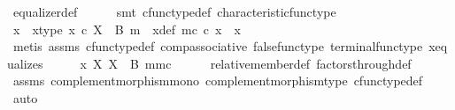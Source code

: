 \begin{isabellebody}
\ equalizer{\isacharunderscore}{\kern0pt}def\isanewline
\ \ \ \ \isamarkupfalse%
\ {\isacharparenleft}{\kern0pt}smt\ cfunc{\isacharunderscore}{\kern0pt}type{\isacharunderscore}{\kern0pt}def\ characteristic{\isacharunderscore}{\kern0pt}func{\isacharunderscore}{\kern0pt}type{\isacharparenright}{\kern0pt}\ \isanewline
\ \ \isamarkupfalse%
\ \isamarkupfalse%
\ x{\isacharprime}{\kern0pt}\ \ x{\isacharprime}{\kern0pt}{\isacharunderscore}{\kern0pt}type{\isacharcolon}{\kern0pt}\ {\isachardoublequoteopen}x{\isacharprime}{\kern0pt}\ {\isasymin}\isactrlsub c\ X\ {\isasymsetminus}\ {\isacharparenleft}{\kern0pt}B{\isacharcomma}{\kern0pt}\ m{\isacharparenright}{\kern0pt}{\isachardoublequoteclose}\ \ x{\isacharprime}{\kern0pt}{\isacharunderscore}{\kern0pt}def{\isacharcolon}{\kern0pt}\ {\isachardoublequoteopen}m\isactrlsup c\ {\isasymcirc}\isactrlsub c\ x{\isacharprime}{\kern0pt}\ {\isacharequal}{\kern0pt}\ x{\isachardoublequoteclose}\isanewline
\ \ \ \ \isamarkupfalse%
\ {\isacharparenleft}{\kern0pt}metis\ assms{\isacharparenleft}{\kern0pt}{}{\isacharparenright}{\kern0pt}\ cfunc{\isacharunderscore}{\kern0pt}type{\isacharunderscore}{\kern0pt}def\ comp{\isacharunderscore}{\kern0pt}associative\ false{\isacharunderscore}{\kern0pt}func{\isacharunderscore}{\kern0pt}type\ terminal{\isacharunderscore}{\kern0pt}func{\isacharunderscore}{\kern0pt}type\ x{\isacharunderscore}{\kern0pt}equalizes{\isacharparenright}{\kern0pt}\isanewline
\ \ \isamarkupfalse%
\ \isamarkupfalse%
\ {\isachardoublequoteopen}x\ {\isasymin}\isactrlbsub X\isactrlesub \ {\isacharparenleft}{\kern0pt}X\ {\isasymsetminus}\ {\isacharparenleft}{\kern0pt}B{\isacharcomma}{\kern0pt}\ m{\isacharparenright}{\kern0pt}{\isacharcomma}{\kern0pt}m\isactrlsup c{\isacharparenright}{\kern0pt}{\isachardoublequoteclose}\isanewline
\ \ \ \ \isamarkupfalse%
\ relative{\isacharunderscore}{\kern0pt}member{\isacharunderscore}{\kern0pt}def\ factors{\isacharunderscore}{\kern0pt}through{\isacharunderscore}{\kern0pt}def\isanewline
\ \ \ \ \isamarkupfalse%
\ assms\ complement{\isacharunderscore}{\kern0pt}morphism{\isacharunderscore}{\kern0pt}mono\ complement{\isacharunderscore}{\kern0pt}morphism{\isacharunderscore}{\kern0pt}type\ cfunc{\isacharunderscore}{\kern0pt}type{\isacharunderscore}{\kern0pt}def\ \isamarkupfalse%
\ auto\isanewline
{}\isamarkupfalse%
%
\endisatagproof
{\isafoldproof}%
%
\isadelimproof
\isanewline
%
\endisadelimproof

\end{isabellebody}

